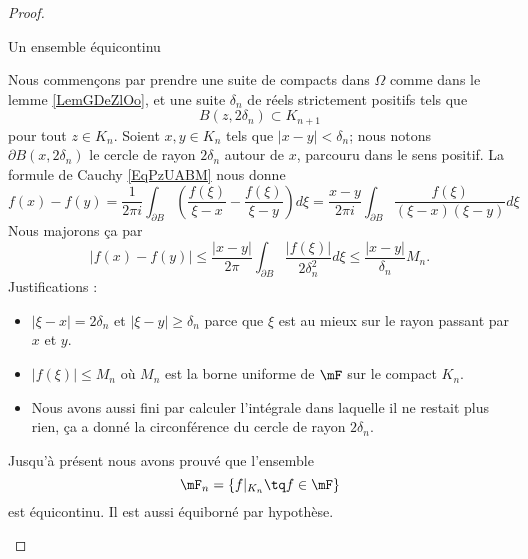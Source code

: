 \begin{proof}

    \begin{subproof}
    \item[Un ensemble équicontinu]

        Nous commençons par prendre une suite de compacts dans \( \Omega\) comme dans le lemme \ref{LemGDeZlOo}, et une suite \( \delta_n\) de réels strictement positifs tels que
        \begin{equation}
            B(z,2\delta_n)\subset K_{n+1}
        \end{equation}
        pour tout \( z\in K_n\). Soient \( x,y\in K_n\) tels que \( | x-y |<\delta_n\); nous notons \( \partial B(x,2\delta_n)\) le cercle de rayon \( 2\delta_n\) autour de \( x\), parcouru dans le sens positif. La formule de Cauchy \ref{EqPzUABM} nous donne
        \begin{equation}
                f(x)-f(y)=\frac{1}{ 2\pi i }\int_{\partial B}\left( \frac{ f(\xi) }{ \xi-x }-\frac{ f(\xi) }{ \xi-y } \right)d\xi
                =\frac{ x-y }{ 2\pi i }\int_{\partial B}\frac{ f(\xi) }{ (\xi-x)(\xi-y) }d\xi
        \end{equation}
        Nous majorons ça par
        \begin{equation}
            \big| f(x)-f(y) \big|\leq\frac{ | x-y | }{ 2\pi }\int_{\partial B}\frac{ | f(\xi) | }{ 2\delta_n^2 }d\xi\leq \frac{ | x-y | }{ \delta_n }M_n.
        \end{equation}
        Justifications :
        \begin{itemize}
            \item 
                \( | \xi-x |=2\delta_n\) et \( | \xi-y |\geq \delta_n\) parce que \( \xi\) est au mieux sur le rayon passant par \( x\) et \( y\).
            \item
                \( | f(\xi) |\leq M_n\) où \( M_n\) est la borne uniforme de \( \mF\) sur le compact \( K_n\). 
            \item
                Nous avons aussi fini par calculer l'intégrale dans laquelle il ne restait plus rien, ça a donné la circonférence du cercle de rayon \( 2\delta_n\).
        \end{itemize}
        Jusqu'à présent nous avons prouvé que l'ensemble
        \begin{equation}
            \mF_n=\{ f|_{K_n}\tq f\in\mF \}
        \end{equation}
        est équicontinu. Il est aussi équiborné par hypothèse.


\end{subproof}
\end{proof}
